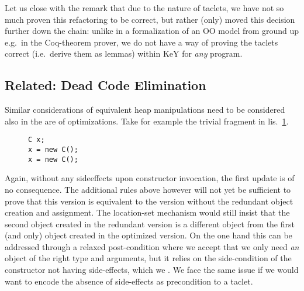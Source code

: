 Let us close with the remark that due to the nature of taclets, we have not so much proven this refactoring to be correct,
but rather (only) moved this decision further down the chain: unlike in a formalization of an OO model from ground up e.g.\ in the Coq-theorem prover,
we do not have a way of proving the taclets correct (i.e.\ derive them as lemmas) within KeY for \textit{any} program.

\subsection*{Related: Dead Code Elimination}
Similar considerations of equivalent heap manipulations need to be considered also in the are of optimizations.
Take for example the trivial fragment in lis.~\ref{lst:xisnewxisnew}.
\begin{figure}
\centering
\begin{minipage}{.2\linewidth}
\begin{lstlisting}[style=refinity]
C x;
x = new C();
x = new C();
\end{lstlisting}
\end{minipage}
\label{lst:xisnewxisnew}
\end{figure}
Again, without any sideeffects upon constructor invocation, the first update is of no consequence.
The additional rules above however will not yet be sufficient to prove that this version is equivalent to the version without the redundant object creation and assignment.
The location-set mechanism would still insist that the second object created  in the redundant version is a different object from the first (and only) object created in the optimized version.
On the one hand this can be addressed through a relaxed post-condition where we accept that we only need \textit{an} object of the right type and arguments, but it relies on the side-condition of the constructor not having side-effects, which we .
We face the same issue if we would want to encode the absence of side-effects as precondition to a taclet.

